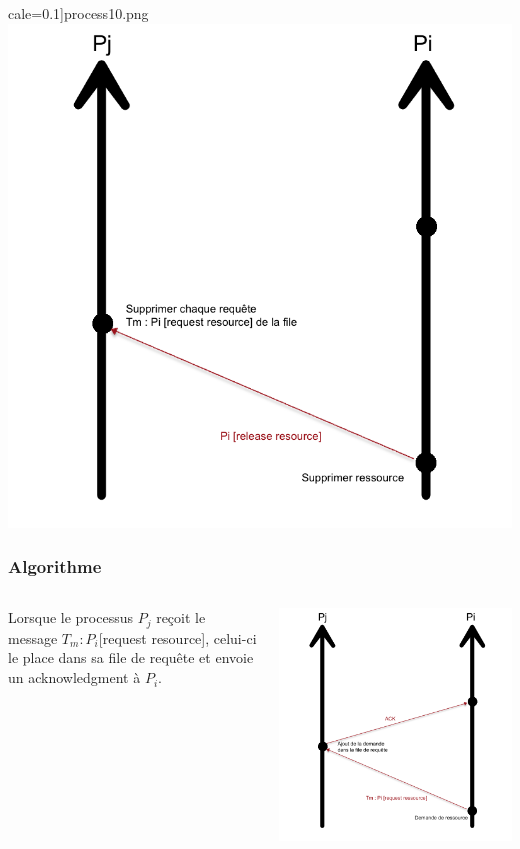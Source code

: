 \documentclass[compress]{beamer}
\begin{document}
\begin{frame}
cale=0.1]{process10.png}\includegraphics[scale=0.1]{process11.png}
\end{frame}

\begin{frame}
\frametitle{Algorithme}
	\begin{columns}
    	\begin{column}{.65\textwidth}
			Lorsque le processus $P_j$ reçoit le message $T_m : P_i$[request resource], celui-ci le place dans sa file de requête et envoie un acknowledgment à $P_i$.
		\end{column}
		\begin{column}{.35\textwidth}
			\includegraphics[scale=0.13]{process9.png}
		\end{column}
	\end{columns}
	

\end{frame}
\end{document}
